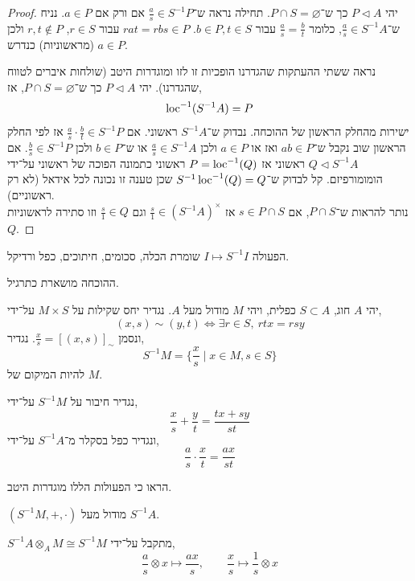 \begin{proof}
	יהי $P \triangleleft A$ כך ש־$P \cap S = \varnothing$.
	תחילה נראה ש־$\frac{a}{s} \in S^{-1} P$ אם ורק אם $a \in P$.
	נניח ש־$\frac{a}{s} \in S^{-1} A$, כלומר $\frac{a}{s} = \frac{b}{t}$ עבור $b \in P, t \in S$.
	$r a t = r b s \in P$ עבור $r \in S$, $r, t \notin P$ ולכן $a \in P$ (מראשוניות) כנדרש.

	נראה ששתי ההעתקות שהגדרנו הופכיות זו לזו ומוגדרות היטב (שולחות איברים לטווח שהגדרנו).
	יהי $P \triangleleft A$ כך ש־$P \cap S = \varnothing$, אז,
	\[
		\operatorname{loc}^{-1}(S^{-1} A)
		= P
	\]
	ישירות מהחלק הראשון של ההוכחה.
	נבדוק ש־$S^{-1} A$ ראשוני. אם $\frac{a}{s} \cdot \frac{b}{t} \in S^{-1} P$ אז לפי החלק הראשון שוב נקבל ש־$a b \in P$ ואז או $a \in P$ ולכן $\frac{a}{s} \in S^{-1} A$ או ש־$b \in P$ ולכן $\frac{b}{s} \in S^{-1} P$.
	אם $Q \triangleleft S^{-1} A$ ראשוני אז $P = \operatorname{loc}^{-1}(Q)$ ראשוני כתמונה הפוכה של ראשוני על־ידי הומומורפיזם.
	קל לבדוק ש־$S^{-1} \operatorname{loc}^{-1}(Q) = Q$ שכן טענה זו נכונה לכל אידאל (לא רק ראשוניים). \\
	נותר להראות ש־$P \cap S$, אם $s \in P \cap S$ אז $\frac{s}{1} \in {(S^{-1} A)}^\times$ וגם $\frac{s}{1} \in Q$ וזו סתירה לראשוניות $Q$.
\end{proof}
\begin{proposition}
	הפעולה $I \mapsto S^{-1} I$ שומרת הכלה, סכומים, חיתוכים, כפל ורדיקל.
\end{proposition}
ההוכחה מושארת כתרגיל.
\begin{definition}
	יהי $A$ חוג, $S \subset A$ כפלית, ויהי $M$ מודול מעל $A$.
	נגדיר יחס שקילות על $M \times S$ על־ידי,
	\[
		(x, s) \sim (y, t)
		\iff \exists r \in S,\ r t x = r s y
	\]
	ונסמן $\frac{x}{s} = {[ (x, s) ]}_\sim$.
	נגדיר,
	\[
		S^{-1} M
		= \{ \frac{x}{s} \mid x \in M, s \in S \}
	\]
	להיות המיקום של $M$.
\end{definition}
נגדיר חיבור על $S^{-1} M$ על־ידי,
\[
	\frac{x}{s} + \frac{y}{t}
	= \frac{t x + s y}{s t}
\]
ונגדיר כפל בסקלר מ־$S^{-1} A$ על־ידי,
\[
	\frac{a}{s} \cdot \frac{x}{t}
	= \frac{a x}{s t}
\]
\begin{exercise}
	הראו כי הפעולות הללו מוגדרות היטב.
\end{exercise}
\begin{proposition}
	$(S^{-1} M, +, \cdot)$ מודול מעל $S^{-1} A$.
\end{proposition}
\begin{proposition}
	$S^{-1} A \otimes_A M \cong S^{-1} M$ מתקבל על־ידי,
	\[
		\frac{a}{s} \otimes x
		\mapsto \frac{a x}{s},
		\qquad
		\frac{x}{s}
		\mapsto \frac{1}{s} \otimes x
	\]
\end{proposition}
